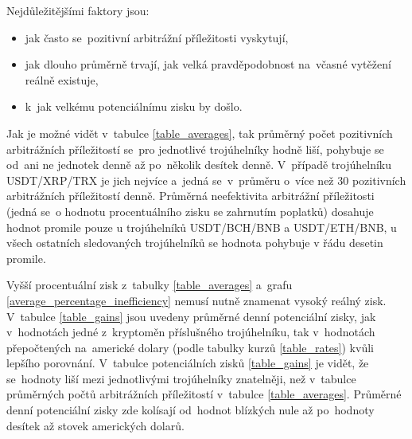 \documentclass[thesis=B,czech]{FITthesis}[2019/03/21]
\begin{document}
Nejdůležitějšími faktory jsou: 
\begin{itemize}
    \item jak často se~pozitivní arbitrážní příležitosti vyskytují,
    \item jak dlouho průměrně trvají, jak velká pravděpodobnost na~včasné \linebreak vytěžení reálně existuje,
    \item k~jak velkému potenciálnímu zisku by došlo.
\end{itemize}
Jak je možné vidět v~tabulce \ref{table_averages}, tak průměrný počet pozitivních arbitrážních příležitostí se~pro jednotlivé trojúhelníky hodně liší, pohybuje se od~ani ne jednotek denně až po~několik desítek denně. V~případě trojúhelníku  \linebreak USDT/XRP/TRX je jich nejvíce a~jedná se~v~průměru o~více než 30 pozitivních arbitrážních příležitostí denně. Průměrná neefektivita arbitrážní příležitosti (jedná se~o hodnotu procentuálního zisku se zahrnutím poplatků) dosahuje hodnot promile pouze u trojúhelníků USDT/BCH/BNB \linebreak a USDT/ETH/BNB, u všech ostatních sledovaných trojúhelníků se hodnota pohybuje v řádu desetin promile.

Vyšší procentuální zisk z~tabulky \ref{table_averages} a~grafu \ref{average_percentage_inefficiency} nemusí nutně znamenat vysoký reálný zisk. V~tabulce \ref{table_gains} jsou uvedeny průměrné denní potenciální zisky, jak v~hodnotách jedné z~kryptoměn příslušného trojúhelníku, tak v~hodnotách přepočtených na~americké dolary (podle tabulky kurzů \ref{table_rates}) kvůli lepšího porovnání. V~tabulce potenciálních zisků \ref{table_gains} je vidět, že se~hodnoty liší mezi jednotlivými trojúhelníky znatelněji, než v~tabulce průměrných počtů arbitrážních příležitostí v~tabulce \ref{table_averages}. Průměrné denní potenciální zisky zde kolísají od~hodnot blízkých nule až po~hodnoty desítek až stovek amerických dolarů. 


\end{document}
